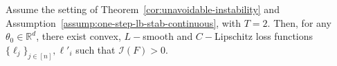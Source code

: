 \documentclass[twoside,11pt]{article}
\newtheorem{assumption}{Assumption}
\newcommand{\R}{\mathbb{R}}
\newcommand{\F}{\mathcal{F}}
\begin{document}
\begin{lemma}\label{thm:1-step-dsep}
    Assume the setting of Theorem~\ref{cor:unavoidable-instability} and Assumption~\ref{assump:one-step-lb-stab-continuous}, with $T=2$. 
    Then, for any $\theta_0 \in \R^d$, there exist convex, $L-$smooth and $C-$Lipschitz loss functions $\{\ell_j\}_{j \in [n]}, \ell'_i$ such that $ \mathcal{I}(F) > 0$.
\end{lemma}
\end{document}
